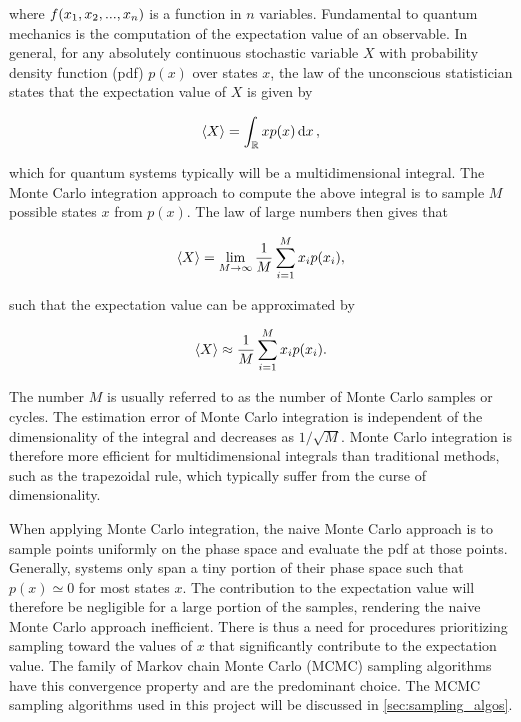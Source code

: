 where $f \qty(x_1, x_2, ..., x_n)$ is a function in $n$ variables. Fundamental to quantum mechanics is the computation of the expectation value of an observable. In general, for any absolutely continuous stochastic variable $X$ with probability density function (pdf) $p(x)$ over states $x$, the law of the unconscious statistician states that the expectation value of $X$ is given by 

\begin{equation}\label{eq:general_expval}
    \expval{X} = \int_{\mathbb{R}} x p (x) \dd{x},
\end{equation}

which for quantum systems typically will be a multidimensional integral. The Monte Carlo integration approach to compute the above integral is to sample $M$ possible states $x$ from $p(x)$. The law of large numbers then gives that 

\begin{equation*}
    \expval{X} = \lim_{M \to \infty} \frac{1}{M} \sum_{i=1}^M x_i p \qty(x_i),
\end{equation*}

such that the expectation value can be approximated by

\begin{equation}\label{eq:mc_integration}
    \expval{X} \approx \frac{1}{M} \sum_{i=1}^M x_i p \qty(x_i).
\end{equation}

The number $M$ is usually referred to as the number of Monte Carlo samples or cycles. The estimation error of Monte Carlo integration is independent of the dimensionality of the integral and decreases as $1 / \sqrt{M}$. Monte Carlo integration is therefore more efficient for multidimensional integrals than traditional methods, such as the trapezoidal rule, which typically suffer from the curse of dimensionality. 

When applying Monte Carlo integration, the naive Monte Carlo approach is to sample points uniformly on the phase space and evaluate the pdf at those points. Generally, systems only span a tiny portion of their phase space such that $p(x) \simeq 0$ for most states $x$. The contribution to the expectation value will therefore be negligible for a large portion of the samples, rendering the naive Monte Carlo approach inefficient. There is thus a need for procedures prioritizing sampling toward the values of $x$ that significantly contribute to the expectation value. The family of Markov chain Monte Carlo (MCMC) sampling algorithms have this convergence property and are the predominant choice. The MCMC sampling algorithms used in this project will be discussed in \autoref{sec:sampling_algos}.

